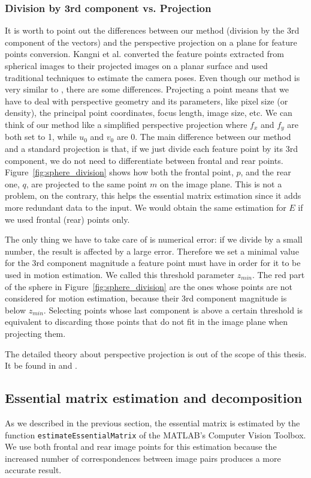 \subsubsection{Division by 3rd component vs. Projection}
It is worth to point out the differences between our method (division by the 3rd 
component of the vectors) and the perspective projection on a plane for feature
points conversion. Kangni et al. \cite{kangni2007orientation} converted the 
feature points extracted from spherical images to their projected images on a 
planar surface and used traditional techniques to estimate the camera poses.
Even though our method is very similar to \cite{kangni2007orientation}, there 
are some differences.
Projecting a point means that we have to deal with perspective geometry and its
parameters, like pixel size (or density), the principal point coordinates, 
focus length, image size, etc.
We can think of our method like a simplified perspective projection where
$f_x$ and $f_y$ are both set to 1, while $u_0$ and $v_0$ are 0.
The main difference between our method and a standard projection is that, if we
just divide each feature point by its 3rd component, we do not need to 
differentiate between frontal and rear points.
Figure~\ref{fig:sphere_division} shows how both the frontal point, $p$, and the 
rear one, $q$, are projected to the same point $m$ on the image plane.
This is not a problem, on the contrary, this helps the essential matrix 
estimation since it adds more redundant data to the input. We would obtain the
same estimation for $E$ if we used frontal (rear) points only.

The only thing we have to take care of is numerical error: if we divide by a 
small number, the result is affected by a large error. Therefore we
set a minimal value for the 3rd component magnitude a feature point must 
have in order for it to be used in motion estimation. 
We called this threshold parameter $z_{min}$.
The red part of the sphere in Figure~\ref{fig:sphere_division} are the ones
whose points are not considered for motion estimation, because their 
3rd component magnitude is below $z_{min}$.
Selecting points whose last component is above a certain threshold is 
equivalent to discarding those points that do not fit in the image plane
when projecting them.

The detailed theory about perspective projection is out of the scope of this 
thesis. It be found in \cite{szeliski2010computer} and \cite{Hartley2004}.

\subsection{Essential matrix estimation and decomposition}
As we described in the previous section, the essential matrix is estimated 
by the function {\tt estimateEssentialMatrix} of the MATLAB's 
Computer Vision Toolbox.
We use both frontal and rear image points for this estimation because
the increased number of correspondences between image pairs produces 
a more accurate result.

